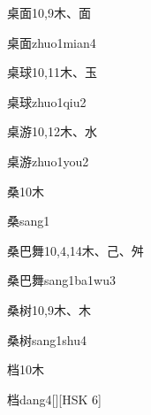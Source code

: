 \begin{Entry}{桌面}{10,9}{⽊、⾯}
  \begin{Phonetics}{桌面}{zhuo1mian4}
  \end{Phonetics}
\end{Entry}

\begin{Entry}{桌球}{10,11}{⽊、⽟}
  \begin{Phonetics}{桌球}{zhuo1qiu2}
  \end{Phonetics}
\end{Entry}

\begin{Entry}{桌游}{10,12}{⽊、⽔}
  \begin{Phonetics}{桌游}{zhuo1you2}
  \end{Phonetics}
\end{Entry}

\begin{Entry}{桑}{10}{⽊}
  \begin{Phonetics}{桑}{sang1}
  \end{Phonetics}
\end{Entry}

\begin{Entry}{桑巴舞}{10,4,14}{⽊、⼰、⾇}
  \begin{Phonetics}{桑巴舞}{sang1ba1wu3}
  \end{Phonetics}
\end{Entry}

\begin{Entry}{桑树}{10,9}{⽊、⽊}
  \begin{Phonetics}{桑树}{sang1shu4}
  \end{Phonetics}
\end{Entry}

\begin{Entry}{档}{10}{⽊}
  \begin{Phonetics}{档}{dang4}[][HSK 6]
  \end{Phonetics}
\end{Entry}

